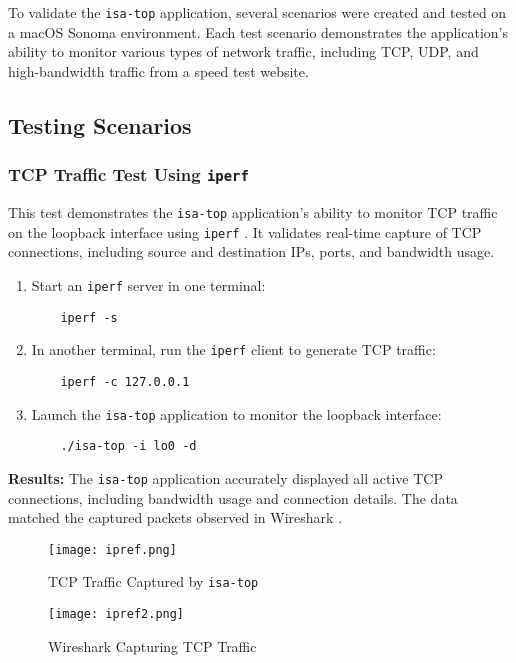 \documentclass[12pt]{extarticle}
\begin{document}
To validate the \texttt{isa-top} application, several scenarios were created and tested on a macOS Sonoma environment. Each test scenario demonstrates the application’s ability to monitor various types of network traffic, including TCP, UDP, and high-bandwidth traffic from a speed test website.

\subsection{Testing Scenarios}

\subsubsection{TCP Traffic Test Using \texttt{iperf}}

This test demonstrates the \texttt{isa-top} application’s ability to monitor TCP traffic on the loopback interface using \texttt{iperf} \cite{iperf}. It validates real-time capture of TCP connections, including source and destination IPs, ports, and bandwidth usage.

\begin{enumerate}
    \item Start an \texttt{iperf} server in one terminal:
    \begin{verbatim}
    iperf -s
    \end{verbatim}
    \item In another terminal, run the \texttt{iperf} client to generate TCP traffic:
    \begin{verbatim}
    iperf -c 127.0.0.1
    \end{verbatim}
    \item Launch the \texttt{isa-top} application to monitor the loopback interface:
    \begin{verbatim}
    ./isa-top -i lo0 -d
    \end{verbatim}
\end{enumerate}

\textbf{Results:} The \texttt{isa-top} application accurately displayed all active TCP connections, including bandwidth usage and connection details. The data matched the captured packets observed in Wireshark \cite{libpcap}.

\begin{figure}[H]
    \centering
    \texttt{[image: ipref.png]}
    \caption{TCP Traffic Captured by \texttt{isa-top}}
\end{figure}

\begin{figure}[H]
    \centering
    \texttt{[image: ipref2.png]}
    \caption{Wireshark Capturing TCP Traffic}
\end{figure}
\end{document}
